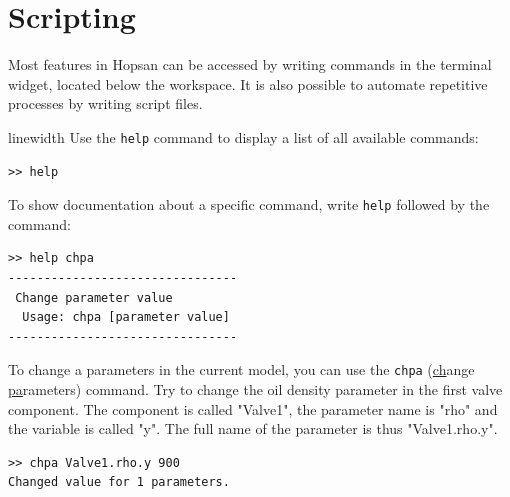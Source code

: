 \documentclass[a4paper,pdftex]{article}
\begin{document}
\newpage
\section{Scripting}
Most features in Hopsan can be accessed by writing commands in the terminal widget, located below the workspace. It is also possible to automate repetitive processes by writing script files. 

\begin{enumerate}
linewidth
Use the \texttt{help} command to display a list of all available commands:

\vspace{5pt}\hspace{10pt}
\begin{minipage}{0.5\linewidth}
\begin{verbatim}
>> help
\end{verbatim}
\end{minipage}
\vspace{5pt}

To show documentation about a specific command, write \texttt{help} followed by the command:

\vspace{5pt}\hspace{10pt}
\begin{minipage}{0.5\linewidth}
\begin{verbatim}
>> help chpa
--------------------------------
 Change parameter value
  Usage: chpa [parameter value]
--------------------------------
\end{verbatim}
\end{minipage}
\vspace{5pt}

To change a parameters in the current model, you can use the \texttt{chpa} (\underline{ch}ange \underline{pa}rameters) command. Try to change the oil density parameter in the first valve component. The component is called "Valve1", the parameter name is "rho" and the variable is called "y". The full name of the parameter is thus "Valve1.rho.y".

\vspace{5pt}\hspace{10pt}
\begin{minipage}{0.5\linewidth}
\begin{verbatim}
>> chpa Valve1.rho.y 900
Changed value for 1 parameters.
\end{verbatim}
\end{minipage}
\vspace{5pt}


\end{enumerate}
\end{document}
